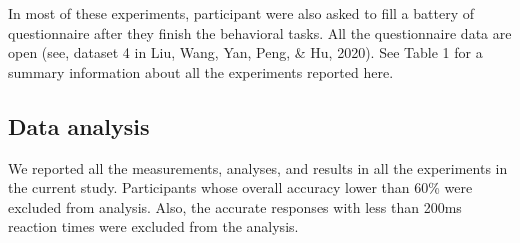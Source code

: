 \documentclass[man]{apa6}
\begin{document}
In most of these experiments, participant were also asked to fill a battery of questionnaire after they finish the behavioral tasks. All the questionnaire data are open (see, dataset 4 in Liu, Wang, Yan, Peng, \& Hu, 2020). See Table 1 for a summary information about all the experiments reported here.

\hypertarget{data-analysis}{%
\subsection{Data analysis}\label{data-analysis}}

We reported all the measurements, analyses, and results in all the experiments in the current study. Participants whose overall accuracy lower than 60\% were excluded from analysis. Also, the accurate responses with less than 200ms reaction times were excluded from the analysis.
\end{document}
